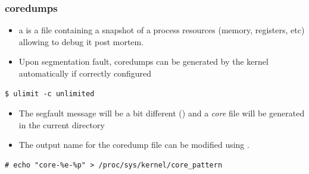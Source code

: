 \begin{frame}[fragile]
  \frametitle{coredumps}
  \begin{itemize}
    \item a  is a file containing a snapshot of a process resources
          (memory, registers, etc) allowing to debug it post mortem.
    \item Upon segmentation fault, coredumps can be generated by the kernel
          automatically if correctly configured
  \end{itemize}

  \begin{block}{}
    \begin{verbatim}
$ ulimit -c unlimited
    \end{verbatim}
  \end{block}

  \begin{itemize}
    \item The segfault message will be a bit different () and a {\em core} file will be generated in the
          current directory
    \item The output name for the coredump file can be modified using
          .
  \end{itemize}

\begin{block}{}
  \begin{verbatim}
# echo "core-%e-%p" > /proc/sys/kernel/core_pattern
  \end{verbatim}
\end{block}
\end{frame}

